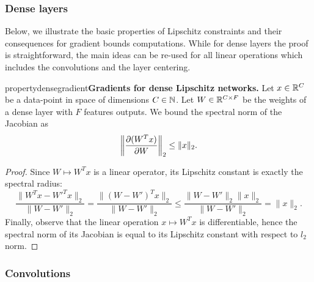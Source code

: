     \subsubsection{Dense layers}

    Below, we illustrate the basic properties of Lipschitz constraints and their consequences for gradient bounds computations. While for dense layers the proof is straightforward, the main ideas can be re-used for all linear operations which includes the convolutions and the layer centering.
    
    \begin{restatable}{property}{densegradient}{\normalfont\textbf{Gradients for dense Lipschitz networks.}}
            Let $x\in\mathbb{R}^{C}$ be a data-point in space of dimensions $C\in\mathbb{N}$.  
            Let $W\in\mathbb{R}^{C \times F}$ be the weights of a dense layer with $F$ features outputs.
            We bound the spectral norm of the Jacobian as 
            \begin{equation}
                \left\|\frac{\partial (W^{T}x)}{\partial W}\right\|_2\leq \|x\|_2.
            \end{equation}
        \end{restatable}
    \begin{proof}
        Since $W\mapsto W^Tx$ is a linear operator, its Lipschitz constant is exactly the spectral radius:
        $$\frac{\|W^Tx-W'^Tx\|_2}{\|W-W'\|_2}=\frac{\|(W-W')^Tx\|_2}{\|W-W'\|_2}\leq \frac{\|W-W'\|_2\|x\|_2}{\|W-W'\|_2}= \|x\|_2.$$
        Finally, observe that the linear operation $x\mapsto W^Tx$ is differentiable, hence the spectral norm of its Jacobian is equal to its Lipschitz constant with respect to $l_2$ norm.   
    \end{proof}

    \subsubsection{Convolutions}
    
